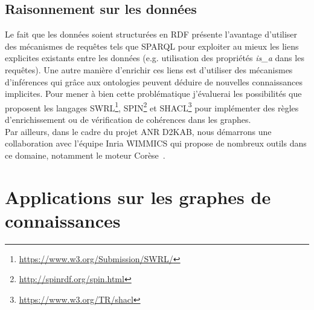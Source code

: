 %


\subsection{Raisonnement sur les données}

Le fait que les données soient structurées en RDF présente l'avantage d'utiliser des mécanismes de requêtes tels que SPARQL pour exploiter au mieux les liens explicites existants entre les données (e.g. utilisation des propriétés \textit{is\_a} dans les requêtes). Une autre manière d’enrichir ces liens est d’utiliser des mécanismes d’inférences qui grâce aux ontologies peuvent déduire de nouvelles connaissances implicites. Pour mener à bien cette problématique j’évaluerai les possibilités que proposent les langages SWRL\footnote{\url{https://www.w3.org/Submission/SWRL/}}, SPIN\footnote{\url{http://spinrdf.org/spin.html}} et SHACL\footnote{\url{https://www.w3.org/TR/shacl}}  pour implémenter des règles d’enrichissement ou de vérification de cohérences dans les graphes.\\
Par ailleurs, dans le cadre du projet ANR D2KAB, nous démarrons une collaboration avec l'équipe Inria WIMMICS qui propose de nombreux outils dans ce domaine, notamment le moteur Corèse~\cite{corese}.

\section{Applications sur les graphes de connaissances}
